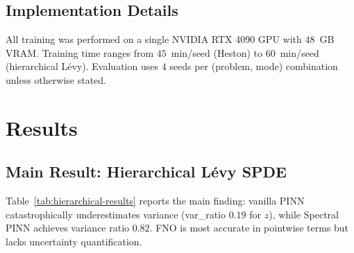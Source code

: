 \documentclass[times,12pt]{elsarticle}
\begin{document}
\subsection{Implementation Details}


All training was performed on a single NVIDIA RTX 4090 GPU with $48$~GB VRAM. Training time ranges from $45$~min/seed (Heston) to $60$~min/seed (hierarchical L\'evy). Evaluation uses $4$ seeds per (problem, mode) combination unless otherwise stated.


\section{Results}
\label{sec:results}

\subsection{Main Result: Hierarchical L\'evy SPDE}

Table~\ref{tab:hierarchical-results} reports the main finding: vanilla PINN catastrophically underestimates variance (var\_ratio $0.19$ for $z$), while Spectral PINN achieves variance ratio $0.82$. FNO is most accurate in pointwise terms but lacks uncertainty quantification.
\end{document}
